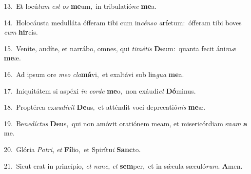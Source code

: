 {\numbfont\textcolor{\numbcolor}{13.}}~Et locú\textit{tum} \textit{est} \textit{os} \textbf{me}\-um,~\star in tribulatió\textit{ne} \textbf{me}\-a.\par
{\numbfont\textcolor{\numbcolor}{14.}}~Holocáusta medulláta ófferam tibi cum in\-\textit{cén}\-\textit{so} \textit{a}\-\textbf{rí}etum:~\star ófferam tibi boves \textit{cum} \textbf{hir}\-cis.\par
{\numbfont\textcolor{\numbcolor}{15.}}~Veníte, audíte, et narrábo, omnes, qui \textit{ti}\-\textit{mé}\textit{tis} \textbf{De}\-um:~\star quanta fecit áni\textit{mæ} \textbf{me}\-æ.\par
{\numbfont\textcolor{\numbcolor}{16.}}~Ad ipsum ore \textit{me}\-\textit{o} \textit{cla}\-\textbf{má}vi,~\star et exaltávi sub lin\textit{gua} \textbf{me}\-a.\par
{\numbfont\textcolor{\numbcolor}{17.}}~Iniquitátem si aspéxi \textit{in} \textit{cor}\-\textit{de} \textbf{me}\-o,~\star non exáudi\textit{et} \textbf{Dó}\-minus.\par
{\numbfont\textcolor{\numbcolor}{18.}}~Proptérea ex\-\textit{au}\-\textit{dí}\textit{vit} \textbf{De}\-us,~\star et atténdit voci deprecatió\textit{nis} \textbf{me}\-æ.\par
{\numbfont\textcolor{\numbcolor}{19.}}~Be\-\textit{ne}\-\textit{díc}\textit{tus} \textbf{De}\-us,~\star qui non amóvit oratiónem meam, et misericórdiam su\textit{am} \textbf{a} me.\par
{\numbfont\textcolor{\numbcolor}{20.}}~Glória \textit{Pa}\-\textit{tri}, \textit{et} \textbf{Fí}\-lio,~\star et Spirítu\textit{i} \textbf{Sanc}\-to.\par
{\numbfont\textcolor{\numbcolor}{21.}}~Sicut erat in princípio, \textit{et} \textit{nunc}\-, \textit{et} \textbf{sem}\-per,~\star et in sǽcula sæculó\-\textit{rum}\-. \textbf{A}\-men.\par
